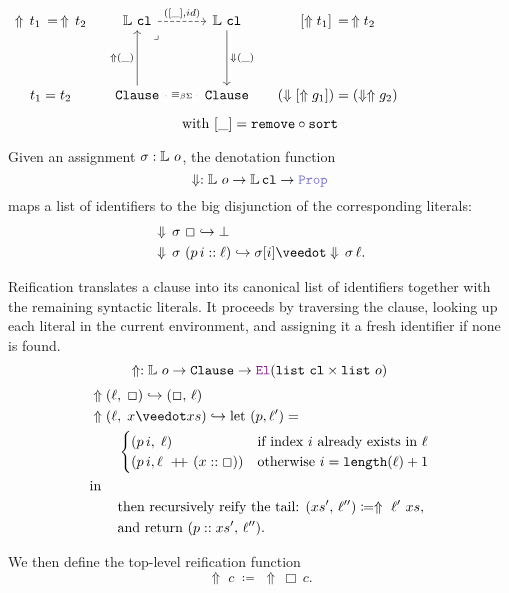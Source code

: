 \begin{center}
\(\begin{tikzcd}[ampersand replacement=\&,column sep=small]
	{\Uparrow\,t_1 \,=\, \Uparrow\,t_2} \& \bb{L}~\kw{cl} \&\& \bb{L}~\kw{cl} \& {[\Uparrow t_1] \,=\, \Uparrow t_2} \\
	\\
	{t_1 = t_2} \& \kw{Clause} \&\& \kw{Clause} \& {(\den{[\Uparrow g_1]}) = (\den{\Uparrow g_2})}
	\arrow["({[\_], id)}", dashed, from=1-2, to=1-4]
	\arrow["\lrcorner"{anchor=center, pos=0.125}, draw=none, from=1-2, to=3-4]
	\arrow["{\Downarrow(\_)}", from=1-4, to=3-4]
	\arrow["{\Uparrow(\_)}", from=3-2, to=1-2]
	\arrow["\equivL"{description}, dotted, no head, from=3-2, to=3-4]
\end{tikzcd}\)
\[
  \text{with } [\_] = \texttt{\upshape{remove}} \circ \texttt{\upshape{sort}}
\]
\end{center}


\begin{definition}[Denotation]\label{def:denotation}
Given an assignment $\sigma : \mathbb{L}~o$, the denotation function
\[
  \Downarrow : \bb{L}~o \to \bb{L}\,\kw{cl} \to \prop
\]
maps a list of identifiers to the big disjunction of the corresponding literals:
\begin{align*}
&\Downarrow\,\sigma~\Box \re \bot \\
&\Downarrow\,\sigma~(p\,i :: \ell) \re \sigma[i] \mathbin{\veedot} \Downarrow\,\sigma\,\ell.
\end{align*}
\end{definition}

\begin{definition}\label{def:reify}
Reification translates a clause into its canonical list of identifiers together with 
the remaining syntactic literals. It proceeds by traversing the clause, 
looking up each literal in the current environment, and assigning it a fresh identifier if none is found.
\[
  \Uparrow  : \bb{L}~o \to \kw{Clause} \to \el (\kw{list}~\kw{cl} \times \kw{list}~o)
\]
\begin{align*}
&\Uparrow (\ell,\;\Box) \re (\Box,\,\ell) \\
&\Uparrow (\ell,\; x \veedot xs) \re \text{let } (p, \ell') = \\
&\qquad\begin{cases}
  (p\,i ,\; \ell) & \text{if index }  i \text{ already exists in } \ell \\
  (p\,i, \ell \concat (x::\Box)) & \text{otherwise } i = \kw{length}(\ell) + 1
\end{cases} \\
&\text{in}\\
&\qquad \text{then recursively reify the tail: } (xs',\,\ell'') \coloneq \Uparrow~\ell'~xs, \\
&\qquad \text{and return } (p :: xs',\, \ell'').
\end{align*}

\noindent
We then define the top-level reification function
\[
  \Uparrow \;c \;\coloneqq\; \Uparrow \,\Box\,c.
\]
\end{definition}

